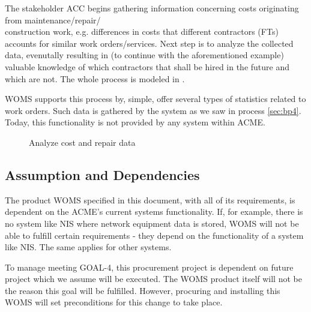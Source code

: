 The stakeholder ACC begins gathering information concerning costs originating from maintenance/repair/\\construction work, e.g. differences in costs that different contractors (FTs) accounts for similar work orders/services.  Next step is to analyze the collected data, evenutally resulting in (to continue with the aforementioned example) valuable knowledge of which contractors that shall be hired in the future and which are not. The whole process is modeled in .

WOMS supports this process by, simple, offer several types of statistics related to work orders. Such data is gathered by the system as we saw in process \ref{sec:bp4}. Today, this functionality is not provided by any system within ACME.
\begin{figure}[H]
	\centering
	\setlength\fboxsep{7pt}
	\setlength\fboxrule{0.5pt}
	\caption{Analyze cost and repair data}
	\label{fig:analyze}
\end{figure}
%
\subsection{Assumption and Dependencies}
\label{sec:assumption_and_dependencies}
The product WOMS specified in this document, with all of its requirements, is dependent on the ACME's current systems functionality. If, for example, there is no system like NIS where network equipment data is stored, WOMS will not be able to fulfill certain requirements - they depend on the functionality of a system like NIS. The same applies for other systems. 

To manage meeting GOAL-4, this procurement project is dependent on future project which we assume will be executed. The WOMS product itself will not be the reason this goal will be fulfilled. However, procuring and installing this WOMS will set preconditions for this change to take place.

